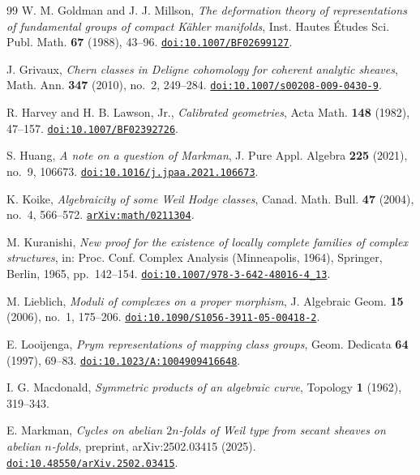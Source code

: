\documentclass[11pt,reqno]{amsart}
\theoremstyle{plain}
\theoremstyle{definition}
\theoremstyle{remark}
\begin{document}
\begin{thebibliography}{99}
W. M. Goldman and J. J. Millson,
\emph{The deformation theory of representations of fundamental groups of
compact K\"ahler manifolds},
Inst. Hautes \'Etudes Sci. Publ. Math. \textbf{67} (1988), 43--96.
\href{https://doi.org/10.1007/BF02699127}{\texttt{doi:10.1007/BF02699127}}.

J. Grivaux,
\emph{Chern classes in Deligne cohomology for coherent analytic sheaves},
Math. Ann. \textbf{347} (2010), no.~2, 249--284.
\href{https://doi.org/10.1007/s00208-009-0430-9}{\texttt{doi:10.1007/s00208-009-0430-9}}.

R. Harvey and H. B. Lawson, Jr.,
\emph{Calibrated geometries},
Acta Math. \textbf{148} (1982), 47--157.
\href{https://doi.org/10.1007/BF02392726}{\texttt{doi:10.1007/BF02392726}}.

S. Huang,
\emph{A note on a question of Markman},
J. Pure Appl. Algebra \textbf{225} (2021), no.~9, 106673.
\href{https://doi.org/10.1016/j.jpaa.2021.106673}{\texttt{doi:10.1016/j.jpaa.2021.106673}}.

K. Koike,
\emph{Algebraicity of some Weil Hodge classes},
Canad. Math. Bull. \textbf{47} (2004), no.~4, 566--572.
\href{https://arxiv.org/abs/math/0211304}{\texttt{arXiv:math/0211304}}.

M. Kuranishi,
\emph{New proof for the existence of locally complete families of complex
structures},
in: Proc. Conf. Complex Analysis (Minneapolis, 1964),
Springer, Berlin, 1965, pp.~142--154.
\href{https://doi.org/10.1007/978-3-642-48016-4_13}{\texttt{doi:10.1007/978-3-642-48016-4\_13}}.

M. Lieblich,
\emph{Moduli of complexes on a proper morphism},
J. Algebraic Geom. \textbf{15} (2006), no.~1, 175--206.
\href{https://doi.org/10.1090/S1056-3911-05-00418-2}%
{\texttt{doi:10.1090/S1056-3911-05-00418-2}}.

E. Looijenga,
\emph{Prym representations of mapping class groups},
Geom. Dedicata \textbf{64} (1997), 69--83.
\href{https://doi.org/10.1023/A:1004909416648}{\texttt{doi:10.1023/A:1004909416648}}.

I. G. Macdonald,
\emph{Symmetric products of an algebraic curve},
Topology \textbf{1} (1962), 319--343.

E. Markman,
\emph{Cycles on abelian $2n$-folds of Weil type from secant sheaves on abelian
$n$-folds}, preprint, arXiv:2502.03415 (2025).
\href{https://doi.org/10.48550/arXiv.2502.03415}{\texttt{doi:10.48550/arXiv.2502.03415}}.


\end{thebibliography}
\end{document}
